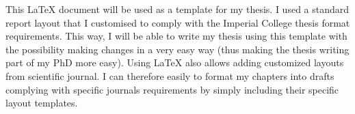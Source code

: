 \documentclass[11pt,letterpaper]{report}
\begin{document}
This LaTeX document will be used as a template for my thesis. I used a standard report layout that I customised to comply with the Imperial College thesis format requirements. This way, I will be able to write my thesis using this template with the possibility making changes in a very easy way (thus making the thesis writing part of my PhD more easy). Using LaTeX also allows adding customized layouts from scientific journal. I can therefore easily to format my chapters into drafts complying with specific journals requirements by simply including their specific layout templates.



\end{document}
